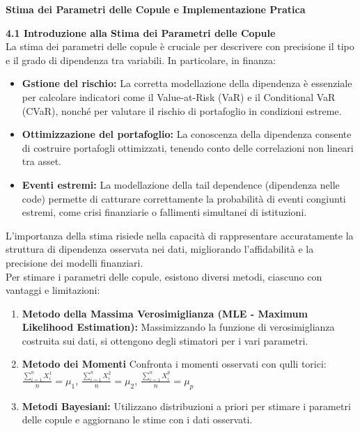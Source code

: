 \documentclass[a4paper,12pt]{article}
\begin{document}
\begin{center}
	\Huge \textbf{Stima dei Parametri delle Copule e Implementazione Pratica} 
\end{center}

\vspace{1cm}
\noindent\textbf{4.1 Introduzione alla Stima dei Parametri delle Copule} \\

\noindent La stima dei parametri delle copule è cruciale per descrivere con precisione il tipo e il grado di dipendenza tra variabili. In particolare, in finanza:

\begin{itemize}
	\item \textbf{Gstione del rischio: }La corretta modellazione della dipendenza è essenziale per calcolare indicatori come il Value-at-Risk (VaR) e il Conditional VaR (CVaR), nonché per valutare il rischio di portafoglio in condizioni estreme.
	\item \textbf{Ottimizzazione del portafoglio: }La conoscenza della dipendenza consente di costruire portafogli ottimizzati, tenendo conto delle correlazioni non lineari tra asset.
	\item \textbf{Eventi estremi: }La modellazione della tail dependence (dipendenza nelle code) permette di catturare correttamente la probabilità di eventi congiunti estremi, come crisi finanziarie o fallimenti simultanei di istituzioni.
\end{itemize}
L'importanza della stima risiede nella capacità di rappresentare accuratamente la struttura di dipendenza osservata nei dati, migliorando l'affidabilità e la precisione dei modelli finanziari.\\
Per stimare i parametri delle copule, esistono diversi metodi, ciascuno con vantaggi e limitazioni:
\begin{enumerate}
	\item \textbf{Metodo della Massima Verosimiglianza (MLE - Maximum Likelihood Estimation):} Massimizzando la funzione di verosimiglianza costruita sui dati, si ottengono degli stimatori per i vari parametri.
	\item \textbf{Metodo dei Momenti} Confronta i momenti osservati con qulli torici: $\frac{\sum_{i=1}^n X_i^1}{n} = \mu_1$, $\frac{\sum_{i=1}^n X_i^2}{n} = \mu_2
	$,  $\frac{\sum_{i=1}^n X_i^p}{n} = \mu_p$
	\item \textbf{Metodi Bayesiani: }Utilizzano distribuzioni a priori per stimare i parametri delle copule e aggiornano le stime con i dati osservati.
\end{enumerate}
\end{document}
